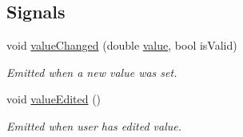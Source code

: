 \subsection*{Signals}
\begin{DoxyCompactItemize}
\item 
void \hyperlink{classmdt_double_edit_a04275f70dcfa22b677841a108dde2561}{value\-Changed} (double \hyperlink{classmdt_double_edit_a6987992984d3cfab5f96467c2b98e511}{value}, bool is\-Valid)
\begin{DoxyCompactList}\small\item\em Emitted when a new value was set. \end{DoxyCompactList}\item 
void \hyperlink{classmdt_double_edit_a4e27d8d57ebb0bc3a9e28e7200cbe953}{value\-Edited} ()
\begin{DoxyCompactList}\small\item\em Emitted when user has edited value. \end{DoxyCompactList}\end{DoxyCompactItemize}
